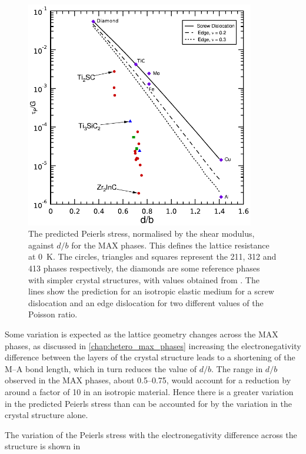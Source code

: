 \begin{figure}
\centering
\includegraphics[width=10cm]{tp_vs_d_upon_b}
\captionsetup{width=12cm}
\caption{The predicted Peierls stress, normalised by the shear modulus, against $d/b$ for the MAX phases. This defines the lattice resistance at \SI{0}{\kelvin}. The circles, triangles and squares represent the 211, 312 and 413 phases respectively, the diamonds are some reference phases with simpler crystal structures, with values obtained from \cite{Clegg2006}. The lines show the prediction for an isotropic elastic medium for a screw dislocation and an edge dislocation for two different values of the Poisson ratio. \label{fig:peierls_stress_vs_d_upon_b}}
\end{figure}


Some variation is expected as the lattice geometry changes across the MAX phases, as discussed in \autoref{chap:hetero_max_phases} increasing the electronegativity difference between the layers of the crystal structure leads to a shortening of the M--A bond length, which in turn reduces the value of $d/b$. The range in $d/b$ observed in the MAX phases, about \numrange{0.5}{0.75}, would account for a reduction by around a factor of \num{10} in an isotropic material. Hence there is a greater variation in the predicted Peierls stress than can be accounted for by the variation in the crystal structure alone. 


The variation of the Peierls stress with the electronegativity difference across the structure is shown in 




